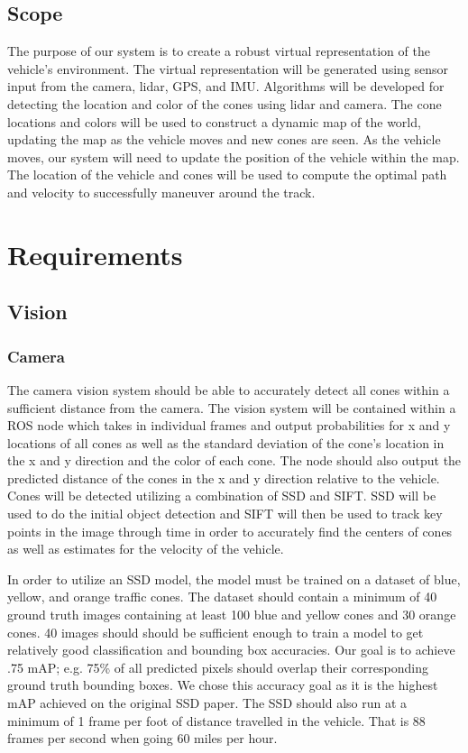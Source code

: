 \documentclass[10pt, onecolumn, draftclsnofoot, letterpaper,compsoc]{IEEEtran}
\begin{document}
\subsection{Scope}

The purpose of our system is to create a robust virtual representation of the vehicle's environment. The virtual representation will be generated using sensor input from the camera, lidar, GPS, and IMU. Algorithms will be developed for detecting the location and color of the cones using lidar and camera. The cone locations and colors will be used to construct a dynamic map of the world, updating the map as the vehicle moves and new cones are seen. As the vehicle moves, our system will need to update the position of the vehicle within the map. The location of the vehicle and cones will be used to compute the optimal path and velocity to successfully maneuver around the track.

\section{Requirements}

\subsection{Vision}
\subsubsection{Camera}
The camera vision system should be able to accurately detect all cones within a sufficient distance from the camera. The vision system will be contained within a ROS node which takes in individual frames and output probabilities for x and y locations of all cones as well as the standard deviation of the cone's location in the x and y direction and the color of each cone. The node should also output the predicted distance of the cones in the x and y direction relative to the vehicle. Cones will be detected utilizing a combination of SSD and SIFT. SSD will be used to do the initial object detection and SIFT will then be used to track key points in the image through time in order to accurately find the centers of cones as well as estimates for the velocity of the vehicle. 

In order to utilize an SSD model, the model must be trained on a dataset of blue, yellow, and orange traffic cones. The dataset should contain a minimum of 40 ground truth images containing at least 100 blue and yellow cones and 30 orange cones. 40 images should should be sufficient enough to train a model to get relatively good classification and bounding box accuracies. Our goal is to achieve .75 mAP; e.g. 75\% of all predicted pixels should overlap their corresponding ground truth bounding boxes. We chose this accuracy goal as it is the highest mAP achieved on the original SSD paper. The SSD should also run at a minimum of 1 frame per foot of distance travelled in the vehicle. That is 88 frames per second when going 60 miles per hour. 
\end{document}
